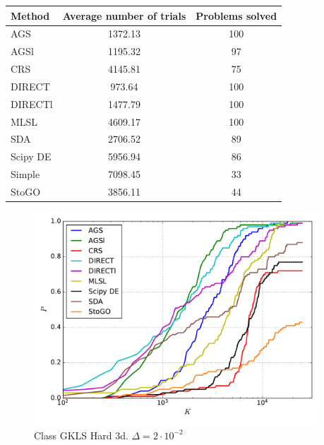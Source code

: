 \documentclass[a4paper]{article}
\begin{document}
\begin{tabular}{lcc}
\hline
 Method   &  Average number of trials  &  Problems solved  \\
\hline
 AGS      &          1372.13           &        100        \\
 AGSl     &          1195.32           &        97         \\
 CRS      &          4145.81           &        75         \\
 DIRECT   &           973.64           &        100        \\
 DIRECTl  &          1477.79           &        100        \\
 MLSL     &          4609.17           &        100        \\
 SDA      &          2706.52           &        89         \\
 Scipy DE &          5956.94           &        86         \\
 Simple   &          7098.45           &        33         \\
 StoGO    &          3856.11           &        44         \\
\hline
\end{tabular}
\begin{figure}[H]
  \center
  \includegraphics[width=0.95\textwidth]{../experiments/gklsh3d/cmc.pdf}
  \caption{Class GKLS Hard 3d. $\Delta=2\cdot10^{-2}$}
\end{figure}
\end{document}
